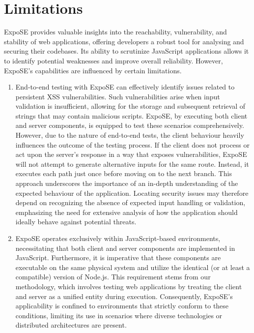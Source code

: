 \section{Limitations}
\label{sec:limitations} 
ExpoSE provides valuable insights into the reachability, vulnerability, and stability of web applications, offering developers a robust tool for analysing and securing their codebases. Its ability to scrutinize JavaScript applications allows it to identify potential weaknesses and improve overall reliability.
However, ExpoSE's capabilities are influenced by certain limitations. 

\begin{enumerate}
    \item End-to-end testing with ExpoSE can effectively identify issues related to persistent XSS vulnerabilities. Such vulnerabilities arise when input validation is insufficient, allowing for the storage and subsequent retrieval of strings that may contain malicious scripts. ExpoSE, by executing both client and server components, is equipped to test these scenarios comprehensively. However, due to the nature of end-to-end tests, the client behaviour heavily influences the outcome of the testing process. If the client does not process or act upon the server's response in a way that exposes vulnerabilities, ExpoSE will not attempt to generate alternative inputs for the same route. Instead, it executes each path just once before moving on to the next branch. This approach underscores the importance of an in-depth understanding of the expected behaviour of the application. Locating security issues may therefore depend on recognizing the absence of expected input handling or validation, emphasizing the need for extensive analysis of how the application should ideally behave against potential threats.
    
    \item ExpoSE operates exclusively within JavaScript-based environments, necessitating that both client and server components are implemented in JavaScript. Furthermore, it is imperative that these components are executable on the same physical system and utilize the identical (or at least a compatible) version of Node.js. This requirement stems from our methodology, which involves testing web applications by treating the client and server as a unified entity during execution. Consequently, ExpoSE's applicability is confined to environments that strictly conform to these conditions, limiting its use in scenarios where diverse technologies or distributed architectures are present.
    

\end{enumerate}
